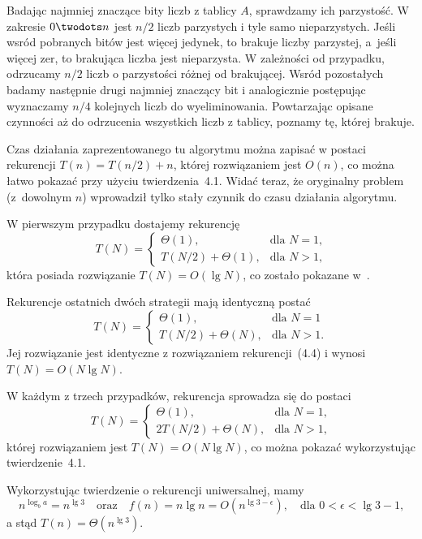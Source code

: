 Badając najmniej znaczące bity liczb z tablicy $A$, sprawdzamy ich parzystość. W zakresie $0\twodots n$ jest $n/2$ liczb parzystych i tyle samo nieparzystych. Jeśli wsród pobranych bitów jest więcej jedynek, to brakuje liczby parzystej, a~jeśli więcej zer, to brakująca liczba jest nieparzysta. W zależności od przypadku, odrzucamy $n/2$ liczb o parzystości różnej od brakującej. Wsród pozostałych badamy następnie drugi najmniej znaczący bit i analogicznie postępując wyznaczamy $n/4$ kolejnych liczb do wyeliminowania. Powtarzając opisane czynności aż do odrzucenia wszystkich liczb z tablicy, poznamy tę, której brakuje.

Czas działania zaprezentowanego tu algorytmu można zapisać w postaci rekurencji $T(n)=T(n/2)+n$, której rozwiązaniem jest $O(n)$, co można łatwo pokazać przy użyciu twierdzenia~4.1. Widać teraz, że oryginalny problem (z~dowolnym $n$) wprowadził tylko stały czynnik do czasu działania algorytmu.


\subexercise{} %
W pierwszym przypadku dostajemy rekurencję
\[
	T(N) = \begin{cases}
		\Theta(1), & \text{dla $N=1$,} \\
		T(N/2)+\Theta(1), & \text{dla $N>1$,}
	\end{cases}
\]
która posiada rozwiązanie $T(N)=O(\lg N)$, co zostało pokazane w~.

\medskip
\noindent Rekurencje ostatnich dwóch strategii mają identyczną postać
\[
	T(N) = \begin{cases}
		\Theta(1), & \text{dla $N=1$} \\
		T(N/2)+\Theta(N), & \text{dla $N>1$.}
	\end{cases}
\]
Jej rozwiązanie jest identyczne z rozwiązaniem rekurencji~(4.4) i wynosi $T(N)=O(N\lg N)$.

\subexercise{} %
W każdym z trzech przypadków, rekurencja sprowadza się do postaci
\[
	T(N) = \begin{cases}
		\Theta(1), & \text{dla $N=1$,} \\
		2T(N/2)+\Theta(N), & \text{dla $N>1$,}
	\end{cases}
\]
której rozwiązaniem jest $T(N)=O(N\lg N)$, co można pokazać wykorzystując twierdzenie~4.1.


\subexercise{} %
Wykorzystując twierdzenie o rekurencji uniwersalnej, mamy
\[
	n^{\log_ba} = n^{\lg3} \quad\text{oraz}\quad f(n) = n\lg n = O(n^{\lg3-\epsilon}), \quad\text{dla $0<\epsilon<\lg3-1$,}
\]
a stąd $T(n)=\Theta(n^{\lg3})$.

